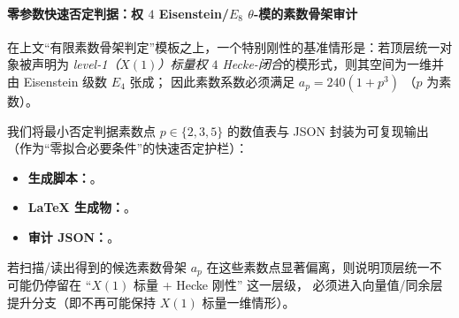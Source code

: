 \paragraph{零参数快速否定判据：权 \texorpdfstring{$4$}{4} Eisenstein/\texorpdfstring{$E_8$}{E8} \texorpdfstring{$\theta$}{theta}-模的素数骨架审计}
在上文“有限素数骨架判定”模板之上，一个特别刚性的基准情形是：若顶层统一对象被声明为
\emph{level-1（\(X(1)\)）标量权 \(4\) Hecke-闭合}的模形式，则其空间为一维并由 Eisenstein 级数 \(E_4\) 张成；
因此素数系数必须满足
\(
a_p=240(1+p^3)
\)
（\(p\) 为素数）。
\par
我们将最小否定判据素数点 \(p\in\{2,3,5\}\) 的数值表与 JSON 封装为可复现输出（作为“零拟合必要条件”的快速否定护栏）：
\begin{itemize}
  \item \textbf{生成脚本：}\texttt{}。
  \item \textbf{LaTeX 生成物：}\texttt{}。
  \item \textbf{审计 JSON：}\texttt{}。
\end{itemize}
若扫描/读出得到的候选素数骨架 \(a_p\) 在这些素数点显著偏离，则说明顶层统一不可能仍停留在 “\(X(1)\) 标量 + Hecke 刚性” 这一层级，
必须进入向量值/同余层提升分支（即不再可能保持 \(X(1)\) 标量一维情形）。
